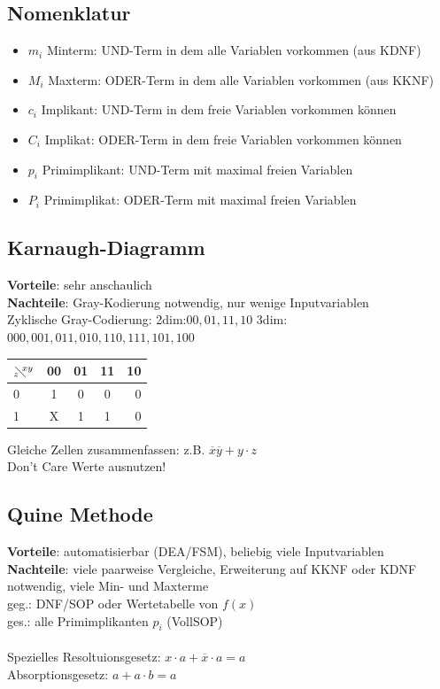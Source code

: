 \documentclass[6pt,a4paper]{scrartcl}
\begin{document}
\begin{multicols*}{3}
	\subsection{Nomenklatur}
	\begin{itemize}\itemsep0pt
	\item $m_i$ Minterm: UND-Term in dem alle Variablen vorkommen (aus KDNF)
	\item $M_i$ Maxterm: ODER-Term in dem alle Variablen vorkommen (aus KKNF)
	\item $c_i$ Implikant: UND-Term in dem freie Variablen vorkommen können
	\item $C_i$ Implikat: ODER-Term in dem freie Variablen vorkommen können
	\item $p_i$ Primimplikant: UND-Term mit maximal freien Variablen
	\item $P_i$ Primimplikat: ODER-Term mit maximal freien Variablen
	\end{itemize}

	\subsection{Karnaugh-Diagramm} %
	\textbf{Vorteile}: sehr anschaulich\\
	\textbf{Nachteile}: Gray-Kodierung notwendig, nur wenige Inputvariablen\\
		Zyklische Gray-Codierung: 2dim:$00,01,11,10$ 3dim:$000,001,011,010,110,111,101,100$
		
	\begin{tabular}{l | c | c |  c | r}
	$_z\!\!\diagdown \!\!^{xy}$ & 00 	& 	01	&	11 	&	10	 	\\ \midrule
	0		&	1 \cellcolor{gray}	&	0	&	0	&	0		\\	
	1		&	X \cellcolor{gray}	&	1 \cellcolor{lightgray}	&	1 \cellcolor{lightgray}	&	0		\\	
	\end{tabular}
	Gleiche Zellen zusammenfassen: z.B. $\overline x \overline y + y \cdot z$\\
	Don't Care Werte ausnutzen!

	\subsection{Quine Methode}
	\textbf{Vorteile}: automatisierbar (DEA/FSM), beliebig viele Inputvariablen\\
	\textbf{Nachteile}: viele paarweise Vergleiche, Erweiterung auf KKNF oder KDNF notwendig, viele Min- und Maxterme\\
	geg.: DNF/SOP oder Wertetabelle von $f(x)$ \\
	ges.: alle Primimplikanten $p_i$ (VollSOP)  \\ \\
	Spezielles Resoltuionsgesetz: $x\cdot a + \overline x \cdot a = a$ \\
	Absorptionsgesetz: $a + a\cdot b = a$
	

\end{multicols*}
\end{document}
